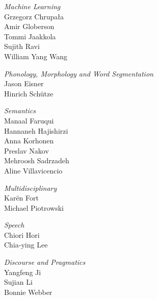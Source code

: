 \emph{Machine Learning} \\
\hspace*{0.2in} Grzegorz Chrupała \\
\hspace*{0.2in} Amir Globerson \\
\hspace*{0.2in} Tommi Jaakkola \\
\hspace*{0.2in} Sujith Ravi \\
\hspace*{0.2in} William Yang Wang

\emph{Phonology, Morphology and Word Segmentation} \\
\hspace*{0.2in} Jason Eisner \\
\hspace*{0.2in} Hinrich Schütze

\emph{Semantics} \\
\hspace*{0.2in} Manaal Faruqui \\
\hspace*{0.2in} Hannaneh Hajishirzi \\
\hspace*{0.2in} Anna Korhonen \\
\hspace*{0.2in} Preslav Nakov \\
\hspace*{0.2in} Mehroosh Sadrzadeh \\
\hspace*{0.2in} Aline Villavicencio

\emph{Multidisciplinary} \\
\hspace*{0.2in} Karën Fort \\
\hspace*{0.2in} Michael Piotrowski

\emph{Speech} \\
\hspace*{0.2in} Chiori Hori \\
\hspace*{0.2in} Chia-ying Lee

\emph{Discourse and Pragmatics} \\
\hspace*{0.2in} Yangfeng Ji \\
\hspace*{0.2in} Sujian Li \\
\hspace*{0.2in} Bonnie Webber


